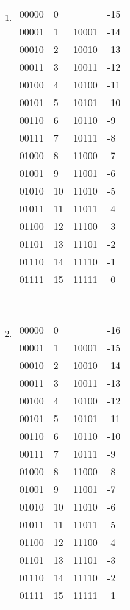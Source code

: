 \begin{enumerate}[leftmargin=2cm,labelsep=.5cm,label=\bf\arabic*.]
\item
\begin{tabu}[t]{r|lr|l}
00000 &0 & &-15 \\
00001 &1 & 10001 &-14 \\
00010 &2 & 10010 &-13 \\
00011 &3 & 10011 &-12 \\
00100 &4 & 10100 &-11 \\
00101 &5 & 10101 &-10 \\
00110 &6 & 10110 &-9 \\
00111 &7 & 10111 &-8 \\
01000 &8 & 11000 &-7 \\
01001 &9 & 11001 &-6 \\
01010 &10 & 11010 &-5 \\
01011 &11 & 11011 &-4 \\
01100 &12 & 11100 &-3 \\
01101 &13 & 11101 &-2 \\
01110 &14 & 11110 &-1 \\
01111 &15 & 11111 &-0 \\
\end{tabu}\\[5mm]

\item 
\begin{tabu}[t]{r|lr|l}
00000 &0 & &-16 \\
00001 &1 & 10001 &-15 \\
00010 &2 & 10010 &-14 \\
00011 &3 & 10011 &-13 \\
00100 &4 & 10100 &-12 \\
00101 &5 & 10101 &-11 \\
00110 &6 & 10110 &-10 \\
00111 &7 & 10111 &-9 \\
01000 &8 & 11000 &-8 \\
01001 &9 & 11001 &-7 \\
01010 &10 & 11010 &-6 \\
01011 &11 & 11011 &-5 \\
01100 &12 & 11100 &-4 \\
01101 &13 & 11101 &-3 \\
01110 &14 & 11110 &-2 \\
01111 &15 & 11111 &-1 \\
\end{tabu}\\[5mm]


\end{enumerate}
